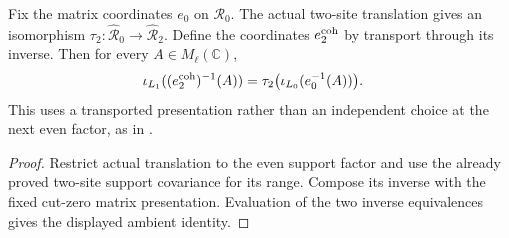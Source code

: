 \begin{lemma}
    \label{lem:qca_margolus_coherent_even_coordinates}
    \leanok
    Fix the matrix coordinates $e_0$ on $\mathcal R_0$. The actual
    two-site translation gives an isomorphism
    $\tau_2:\widehat{\mathcal R}_0\to\widehat{\mathcal R}_2$.
    Define the coordinates $e_2^{\rm coh}$ by transport through its
    inverse. Then for every $A\in M_\ell(\mathbb C)$,
    \begin{align}
        \iota_{L_1}((e_2^{\rm coh})^{-1}(A))
         & =\tau_2\bigl(\iota_{L_0}(e_0^{-1}(A))\bigr).
    \end{align}
    This uses a transported presentation rather than an independent
    choice at the next even factor, as in
    \cite[definition~defBBq, lines~1199--1226]{SchumacherWerner2004QCA}.
\end{lemma}
\begin{proof}
    \leanok
    Restrict actual translation to the even support factor and use the
    already proved two-site support covariance for its range. Compose
    its inverse with the fixed cut-zero matrix presentation. Evaluation
    of the two inverse equivalences gives the displayed ambient identity.
\end{proof}

